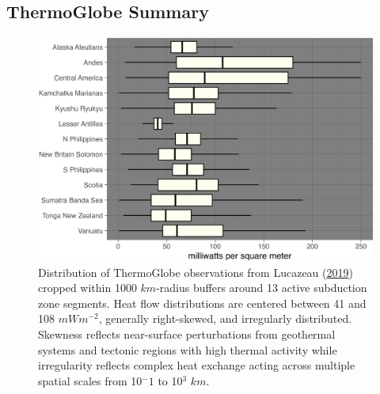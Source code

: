 \clearpage

\hypertarget{thermoglobe-summary}{%
\subsection{ThermoGlobe Summary}\label{thermoglobe-summary}}



\begin{figure}[htbp]

{\centering \includegraphics[width=1\linewidth,]{assets/figs/chpt3/hfSummary} 

}

\caption[Distributions of ThermoGlobe observations near 13 active subduction zone segments]{Distribution of ThermoGlobe observations from Lucazeau (\protect\hyperlink{ref-lucazeau2019}{2019}) cropped within 1000 \(km\)-radius buffers around 13 active subduction zone segments. Heat flow distributions are centered between 41 and 108 \(mWm^{-2}\), generally right-skewed, and irregularly distributed. Skewness reflects near-surface perturbations from geothermal systems and tectonic regions with high thermal activity while irregularity reflects complex heat exchange acting across multiple spatial scales from 10\(^-1\) to 10\(^3\) \(km\).}\label{fig:hfSummaryPlot}
\end{figure}

